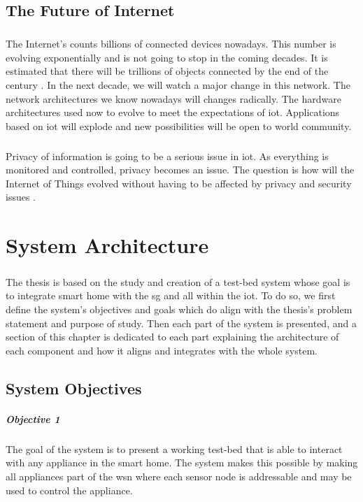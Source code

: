 \documentclass[oneside,12pt,a4paper,final]{book}
\begin{document}
\section{The Future of Internet}
\paragraph{}
The Internet's counts billions of connected devices nowadays. This number is evolving exponentially and is not going to stop in the coming decades. It is estimated that there will be trillions of objects connected by the end of the century \cite{ref3}. In the next decade, we will watch a major change in this network. The network architectures we know nowadays will changes radically. The hardware architectures used now to evolve to meet the expectations of \gls{iot}. Applications based on \gls{iot} will explode and new possibilities will be open to world community.
\paragraph{}
Privacy of information is going to be a serious issue in \gls{iot}. As everything is monitored and controlled, privacy becomes an issue. The question is how will the Internet of Things evolved without having to be affected by privacy and security issues \cite{ref20}.

\chapter{System Architecture}
\paragraph{}
The thesis is based on the study and creation of a test-bed system whose goal is to integrate smart home with the \gls{sg} and all within the \gls{iot}. To do so, we first define the system's objectives and goals which do align  with the thesis's problem statement and purpose of study. Then each part of the system is presented, and a section of this chapter is dedicated to each part explaining the architecture of each component and how it aligns and integrates with the whole system.
\section{System Objectives}
\paragraph{Objective 1}
The goal of the system is to present a working test-bed that is able to interact with any appliance in the smart home. The system makes this possible by making all appliances part of the \gls{wsn} where each sensor node is addressable and may be used to control the appliance.
\end{document}
